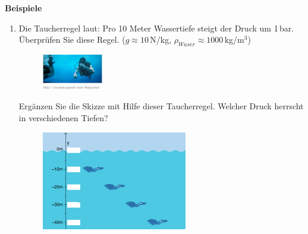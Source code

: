 \documentclass[11pt]{article}
\begin{document}
\vspace{7cm}

\textbf{Beispiele}
\vspace{-0.3cm}


\begin{enumerate}

    

    \item Die Taucherregel laut: Pro 10 Meter Wassertiefe steigt der Druck um 1\,bar. Überprüfen Sie diese Regel. ($g \approx 10\,$N/kg, $\rho_{Waser} \approx 1000\,$kg/m$^3$) 

    \begin{figure}[h!]
    \begin{flushright}
        \includegraphics[width=0.25\textwidth]{images/Taucherregel.jpg}
        \label{fig:Taucher}        
    \end{flushright}
    \end{figure}
    
    \vspace{-1cm}

    Ergänzen Sie die Skizze mit Hilfe dieser Taucherregel. Welcher Druck herrscht in verschiedenen Tiefen?

    \vspace{0.3cm}

    \begin{figure}[h!]
    \begin{flushright}
        \includegraphics[width=0.6\textwidth]{images/Meer_Tiefe.jpg}
        \label{fig:regel}        
    \end{flushright}
    \end{figure}


\end{enumerate}
\end{document}
